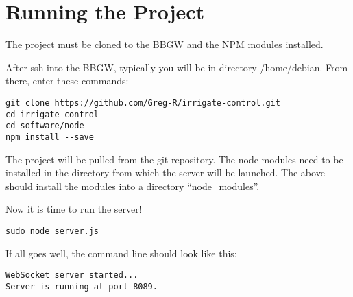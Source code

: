 %
%
%

\chapter{Running the Project}

The project must be cloned to the BBGW and the NPM modules installed.

After ssh into the BBGW, typically you will be in directory /home/debian.
From there, enter these commands:

\begin{verbatim}
git clone https://github.com/Greg-R/irrigate-control.git
cd irrigate-control
cd software/node
npm install --save
\end{verbatim}

The project will be pulled from the git repository.  The node modules need to 
be installed in the directory from which the server will be launched.
The above should install the modules into a directory ``node\_modules''.

Now it is time to run the server!

\begin{verbatim}
sudo node server.js
\end{verbatim}

If all goes well, the command line should look like this:

\begin{verbatim}
WebSocket server started...
Server is running at port 8089.
\end{verbatim}








 
